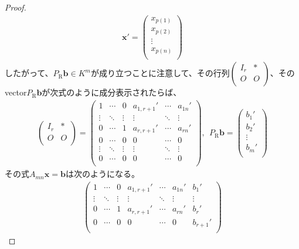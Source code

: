 \documentclass[dvipdfmx]{jsarticle}
\begin{document}
\begin{proof}
\begin{align*}
\mathbf{x}' = \begin{pmatrix}
x_{p(1)} \\
x_{p(2)} \\
 \vdots \\
x_{p(n)} \\
\end{pmatrix}
\end{align*}
したがって、$P_{\mathrm{R}}\mathbf{b} \in K^{m}$が成り立つことに注意して、その行列$\begin{pmatrix}
I_{r} & * \\
O & O \\
\end{pmatrix}$、そのvector$P_{\mathrm{R}}\mathbf{b}$が次式のように成分表示されたらば、
\begin{align*}
\begin{pmatrix}
I_{r} & * \\
O & O \\
\end{pmatrix} = \begin{pmatrix}
1 & \cdots & 0 & a_{1,r + 1}' & \cdots & a_{1n}' \\
 \vdots & \ddots & \vdots & \vdots & \ddots & \vdots \\
0 & \cdots & 1 & a_{r,r + 1}' & \cdots & a_{rn}' \\
0 & \cdots & 0 & 0 & \cdots & 0 \\
 \vdots & \ddots & \vdots & \vdots & \ddots & \vdots \\
0 & \cdots & 0 & 0 & \cdots & 0 \\
\end{pmatrix},\ \ P_{\mathrm{R}}\mathbf{b} = \begin{pmatrix}
b_{1}' \\
b_{2}' \\
 \vdots \\
b_{m}' \\
\end{pmatrix}\end{align*}
その式$A_{mn}\mathbf{x} = \mathbf{b}$は次のようになる。
\begin{align*}
\begin{pmatrix}
1 & \cdots & 0 & a_{1,r + 1}' & \cdots & a_{1n}' & b_{1}' \\
 \vdots & \ddots & \vdots & \vdots & \ddots & \vdots & \vdots \\
0 & \cdots & 1 & a_{r,r + 1}' & \cdots & a_{rn}' & b_{r}' \\
0 & \cdots & 0 & 0 & \cdots & 0 & b_{r + 1}' \\

\end{pmatrix}
\end{align*}
\end{proof}
\end{document}
